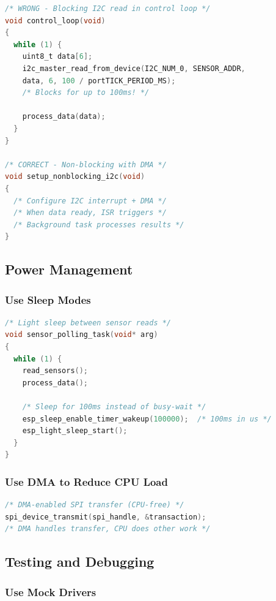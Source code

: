 \begin{lstlisting}[language=C]
/* WRONG - Blocking I2C read in control loop */
void control_loop(void)
{
  while (1) {
    uint8_t data[6];
    i2c_master_read_from_device(I2C_NUM_0, SENSOR_ADDR,
    data, 6, 100 / portTICK_PERIOD_MS);
    /* Blocks for up to 100ms! */
    
    process_data(data);
  }
}

/* CORRECT - Non-blocking with DMA */
void setup_nonblocking_i2c(void)
{
  /* Configure I2C interrupt + DMA */
  /* When data ready, ISR triggers */
  /* Background task processes results */
}


\end{lstlisting}
\subsection{Power Management}

\subsubsection{Use Sleep Modes}

\begin{lstlisting}[language=C]
/* Light sleep between sensor reads */
void sensor_polling_task(void* arg)
{
  while (1) {
    read_sensors();
    process_data();
    
    /* Sleep for 100ms instead of busy-wait */
    esp_sleep_enable_timer_wakeup(100000);  /* 100ms in us */
    esp_light_sleep_start();
  }
}


\end{lstlisting}
\subsubsection{Use DMA to Reduce CPU Load}

\begin{lstlisting}[language=C]
/* DMA-enabled SPI transfer (CPU-free) */
spi_device_transmit(spi_handle, &transaction);
/* DMA handles transfer, CPU does other work */


\end{lstlisting}
\subsection{Testing and Debugging}

\subsubsection{Use Mock Drivers}

